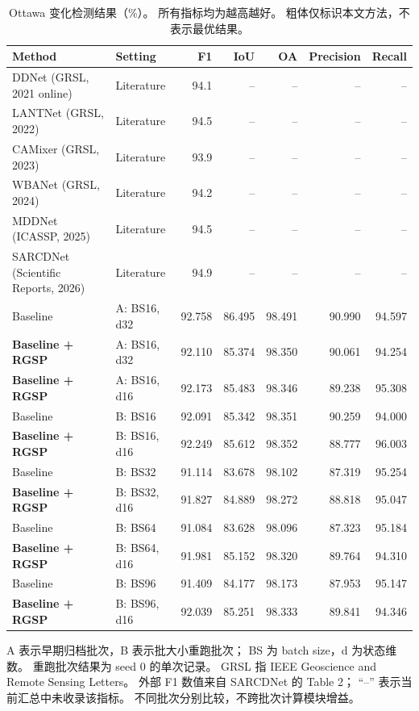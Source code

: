 \documentclass[journal]{IEEEtran}
\begin{document}
\begin{table}[!t]
\centering
\scriptsize
\setlength{\tabcolsep}{2pt}
\renewcommand{\arraystretch}{1.12}
\caption{Ottawa 变化检测结果（\%）。
所有指标均为越高越好。
粗体仅标识本文方法，不表示最优结果。}
\label{tab:ottawa_comparison}
\begin{tabularx}{\linewidth}{@{}Xlrrrrr@{}}
\toprule
Method & Setting & F1 & IoU & OA & Precision & Recall \\
\midrule
DDNet (GRSL, 2021 online)
& Literature & 94.1 & -- & -- & -- & -- \\
LANTNet (GRSL, 2022)
& Literature & 94.5 & -- & -- & -- & -- \\
CAMixer (GRSL, 2023)
& Literature & 93.9 & -- & -- & -- & -- \\
WBANet (GRSL, 2024)
& Literature & 94.2 & -- & -- & -- & -- \\
MDDNet (ICASSP, 2025)
& Literature & 94.5 & -- & -- & -- & -- \\
SARCDNet (Scientific Reports, 2026)
& Literature & 94.9 & -- & -- & -- & -- \\
\midrule
Baseline
& A: BS16, d32
& 92.758 & 86.495 & 98.491 & 90.990 & 94.597 \\
\textbf{Baseline + RGSP}
& A: BS16, d32
& 92.110 & 85.374 & 98.350 & 90.061 & 94.254 \\
\textbf{Baseline + RGSP}
& A: BS16, d16
& 92.173 & 85.483 & 98.346 & 89.238 & 95.308 \\
\midrule
Baseline
& B: BS16
& 92.091 & 85.342 & 98.351 & 90.259 & 94.000 \\
\textbf{Baseline + RGSP}
& B: BS16, d16
& 92.249 & 85.612 & 98.352 & 88.777 & 96.003 \\
Baseline
& B: BS32
& 91.114 & 83.678 & 98.102 & 87.319 & 95.254 \\
\textbf{Baseline + RGSP}
& B: BS32, d16
& 91.827 & 84.889 & 98.272 & 88.818 & 95.047 \\
Baseline
& B: BS64
& 91.084 & 83.628 & 98.096 & 87.323 & 95.184 \\
\textbf{Baseline + RGSP}
& B: BS64, d16
& 91.981 & 85.152 & 98.320 & 89.764 & 94.310 \\
Baseline
& B: BS96
& 91.409 & 84.177 & 98.173 & 87.953 & 95.147 \\
\textbf{Baseline + RGSP}
& B: BS96, d16
& 92.039 & 85.251 & 98.333 & 89.841 & 94.346 \\
\bottomrule
\end{tabularx}

\smallskip
\begin{minipage}{\linewidth}
\footnotesize
A 表示早期归档批次，B 表示批大小重跑批次；
BS 为 batch size，d 为状态维数。
重跑批次结果为 seed 0 的单次记录。
GRSL 指 IEEE Geoscience and Remote Sensing Letters。
外部 F1 数值来自 SARCDNet 的 Table 2；
``--'' 表示当前汇总中未收录该指标。
不同批次分别比较，不跨批次计算模块增益。
\end{minipage}
\end{table}
\end{document}
